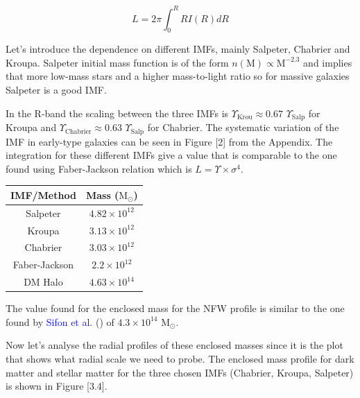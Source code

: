 \begin{equation}
L=2\pi \int_{0}^{R} RI(R)dR
\end{equation}

Let's introduce the dependence on different IMFs, mainly Salpeter, Chabrier and Kroupa. Salpeter initial mass function is of the form $n(\textrm{M})\propto \textrm{M}^{-2.3}$ and implies that more low-mass stars and a higher mass-to-light ratio so for massive galaxies  Salpeter is a good IMF. 

In the R-band the scaling between the three IMFs is $\Upsilon_{\text{Krou}}\approx 0.67$ $\Upsilon_{\text{Salp}}$ for Kroupa and $\Upsilon_{\text{Chabrier}}\approx 0.63$ $\Upsilon_{\text{Salp}}$ for Chabrier. The systematic variation of the IMF in early-type galaxies can be seen in Figure [2] from the Appendix. The integration for these different IMFs give a value that is comparable to the one found using Faber-Jackson relation which is $L=\Upsilon\times\sigma^{4}$. 

\begin{center}
\begin{tabular}{c c}
IMF/Method & Mass ($\text{M}_{\odot}$)\tabularnewline
\hline 
\hline
Salpeter & $4.82\times10^{12}$\tabularnewline
Kroupa & $3.13\times10^{12}$\tabularnewline
Chabrier & $3.03\times10^{12}$\tabularnewline
Faber-Jackson & $2.2\times10^{12}$\tabularnewline
DM Halo & $4.63\times10^{14}$\tabularnewline
\end{tabular}
\end{center}

The value found for the enclosed mass for the NFW profile is similar to the one found by \textcolor{blue}{Sifon et al.} (\citeyear{Reference9}) of $4.3\times 10^{14}$ $\text{M}_{\odot}$.

Now let's analyse the radial profiles of these enclosed masses since it is the plot that shows what radial scale we need to probe. The enclosed mass profile for dark matter and stellar matter for the three chosen IMFs (Chabrier, Kroupa, Salpeter) is shown in Figure [3.4].

